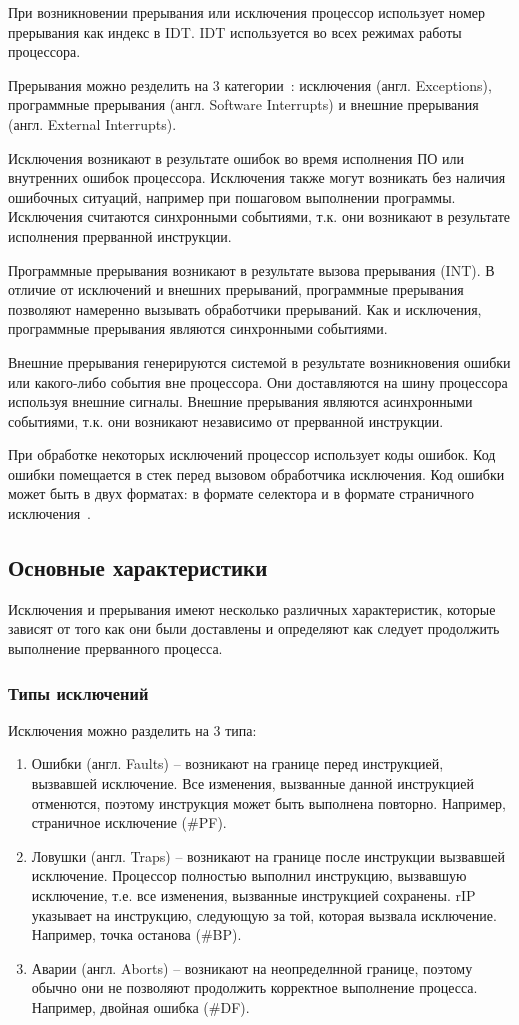 При возникновении прерывания или исключения процессор использует номер
прерывания как индекс в IDT. IDT используется во всех режимах работы процессора.

Прерывания можно резделить на 3 категории~\cite{amd_pm_v2}: исключения (англ. Exceptions),
программные прерывания (англ. Software Interrupts) и внешние прерывания (англ. External Interrupts).

Исключения возникают в результате ошибок во время исполнения ПО или внутренних
ошибок процессора. Исключения также могут возникать без наличия ошибочных
ситуаций, например при пошаговом выполнении программы. Исключения считаются
синхронными событиями, т.к. они возникают в результате исполнения прерванной
инструкции.

Программные прерывания возникают в результате вызова прерывания (INT). В
отличие от исключений и внешних прерываний, программные прерывания позволяют
намеренно вызывать обработчики прерываний. Как и исключения, программные
прерывания являются синхронными событиями.

Внешние прерывания генерируются системой в результате возникновения ошибки
или какого-либо события вне процессора. Они доставляются на шину процессора
используя внешние сигналы. Внешние прерывания являются асинхронными событиями,
т.к. они возникают независимо от прерванной инструкции.

При обработке некоторых исключений процессор использует коды ошибок. Код
ошибки помещается в стек перед вызовом обработчика исключения. Код ошибки
может быть в двух форматах: в формате селектора и в формате
страничного исключения~\cite{amd_pm_v2}.


\subsection{Основные характеристики}
Исключения и прерывания имеют несколько различных характеристик, которые
зависят от того как они были доставлены и определяют как следует продолжить выполнение
прерванного процесса.

\subsubsection*{Типы исключений}
Исключения можно разделить на 3 типа:
\begin{enumerate}[1.]
\item Ошибки (англ. Faults) -- возникают на границе перед
инструкцией, вызвавшей исключение. Все изменения, вызванные данной инструкцией
отменются, поэтому инструкция может быть выполнена повторно. Например,
страничное исключение (\#PF).
\item Ловушки (англ. Traps) -- возникают на границе после
инструкции вызвавшей исключение. Процессор полностью выполнил инструкцию,
вызвавшую исключение, т.е. все изменения, вызванные инструкцией сохранены.
rIP указывает на инструкцию, следующую за той, которая вызвала исключение.
Например, точка останова (\#BP).
\item Аварии (англ. Aborts) -- возникают на неопределнной границе,
поэтому обычно они не позволяют продолжить корректное выполнение процесса.
Например, двойная ошибка (\#DF).
\end{enumerate}

